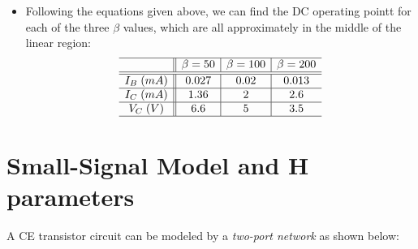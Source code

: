 \documentclass{article}
\begin{document}
\begin{itemize}
\item Following the equations given above, we can find the DC 
  operating pointt for each of the three $\beta$ values, which
  are all approximately in the middle of the linear region:
  \begin{equation}
  \begin{array}{c||c|c|c}\hline
    & \beta=50  & \beta=100 & \beta=200  \\\hline\hline
    I_B\;(mA)  & 0.027 & 0.02     & 0.013 \\\hline
    I_C\;(mA)   & 1.36 & 2     & 2.6      \\\hline
    V_C\;(V)   & 6.6 & 5     & 3.5        \\\hline
  \end{array}
  \end{equation}

\end{itemize}


\section*{Small-Signal Model and H parameters}

A CE transistor circuit can be modeled by a 
{\em two-port network} as shown below:

\end{document}
